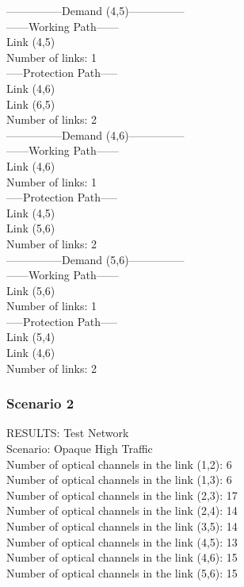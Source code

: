---------------Demand (4,5)--------------- \\

------Working Path------ \\
Link  (4,5) \\
Number of links: 1 \\

-----Protection Path----- \\
Link  (4,6) \\
Link  (6,5) \\
Number of links: 2 \\

---------------Demand (4,6)--------------- \\

------Working Path------ \\
Link  (4,6) \\
Number of links: 1 \\

-----Protection Path----- \\
Link  (4,5) \\
Link  (5,6) \\
Number of links: 2 \\

---------------Demand (5,6)--------------- \\

------Working Path------ \\
Link  (5,6) \\
Number of links: 1 \\

-----Protection Path----- \\
Link  (5,4) \\
Link  (4,6) \\
Number of links: 2 \\

\subsubsection{Scenario 2}

\qquad RESULTS: Test Network \\

\quad Scenario: Opaque High Traffic \\

Number of optical channels in the link (1,2): 6 \\
\qquad Number of optical channels in the link (1,3): 6 \\
\qquad Number of optical channels in the link (2,3): 17 \\
\qquad Number of optical channels in the link (2,4): 14 \\
\qquad Number of optical channels in the link (3,5): 14 \\
\qquad Number of optical channels in the link (4,5): 13 \\
\qquad Number of optical channels in the link (4,6): 15 \\
\qquad Number of optical channels in the link (5,6): 15 \\


